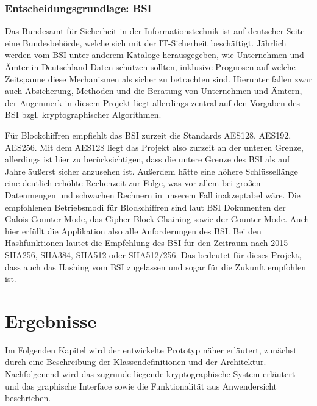 \documentclass[13pt,a4paper,bibliography=totocnumbered,listof=totocnumbered]{scrartcl}
\begin{document}
\subsubsection{Entscheidungsgrundlage: BSI}
Das Bundesamt für Sicherheit in der Informationstechnik ist auf deutscher Seite eine Bundesbehörde, welche sich mit der IT-Sicherheit beschäftigt. Jährlich werden vom BSI unter anderem Kataloge herausgegeben, wie Unternehmen und Ämter in Deutschland Daten schützen sollten, inklusive Prognosen auf welche Zeitspanne diese Mechanismen als sicher zu betrachten sind. Hierunter fallen zwar auch Absicherung, Methoden und die  Beratung von Unternehmen und Ämtern, der Augenmerk in diesem Projekt liegt allerdings zentral auf den Vorgaben des BSI bzgl. kryptographischer Algorithmen.

Für Blockchiffren empfiehlt das BSI zurzeit die Standards AES128, AES192, AES256. Mit dem AES128 liegt das Projekt also zurzeit an der unteren Grenze, allerdings ist hier zu berücksichtigen, dass die untere Grenze des BSI als auf Jahre äußerst sicher anzusehen ist. Außerdem hätte eine höhere Schlüssellänge eine deutlich erhöhte Rechenzeit zur Folge, was vor allem bei großen Datenmengen und schwachen Rechnern in unserem Fall inakzeptabel wäre. Die empfohlenen Betriebsmodi für Blockchiffren sind laut BSI Dokumenten der Galois-Counter-Mode, das Cipher-Block-Chaining sowie der Counter Mode. Auch hier erfüllt die Applikation also alle Anforderungen des BSI. Bei den Hashfunktionen lautet die Empfehlung des BSI für den Zeitraum nach 2015 SHA256, SHA384, SHA512 oder SHA512/256. Das bedeutet für dieses Projekt, dass auch das Hashing vom BSI zugelassen und sogar für die Zukunft empfohlen ist.\\
 \cite{12}\cite{13}

\pagebreak


\section{Ergebnisse}\label{ErgebnisseV}
Im Folgenden Kapitel wird der entwickelte Prototyp näher erläutert, zunächst durch eine Beschreibung der Klassendefinitionen und der Architektur. Nachfolgenend wird das zugrunde liegende kryptographische System erläutert und das graphische Interface sowie die Funktionalität aus Anwendersicht beschrieben.
\end{document}
